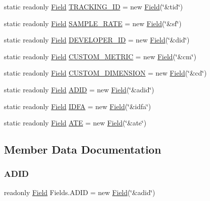 \begin{DoxyCompactItemize}
\item 
static readonly \hyperlink{class_field}{Field} \hyperlink{class_fields_a65770a6babf50e2f116f47436115df42}{T\+R\+A\+C\+K\+I\+N\+G\+\_\+\+ID} = new \hyperlink{class_field}{Field}(\char`\"{}\&tid\char`\"{})
\item 
static readonly \hyperlink{class_field}{Field} \hyperlink{class_fields_abc3a1cf22dab4a6379db835bcace0fdc}{S\+A\+M\+P\+L\+E\+\_\+\+R\+A\+TE} = new \hyperlink{class_field}{Field}(\char`\"{}\&sf\char`\"{})
\item 
static readonly \hyperlink{class_field}{Field} \hyperlink{class_fields_a3d77e1376a9535431a6ac55afaf65ddc}{D\+E\+V\+E\+L\+O\+P\+E\+R\+\_\+\+ID} = new \hyperlink{class_field}{Field}(\char`\"{}\&did\char`\"{})
\item 
static readonly \hyperlink{class_field}{Field} \hyperlink{class_fields_a6048f26caabfa3939d203c44cf59adf3}{C\+U\+S\+T\+O\+M\+\_\+\+M\+E\+T\+R\+IC} = new \hyperlink{class_field}{Field}(\char`\"{}\&cm\char`\"{})
\item 
static readonly \hyperlink{class_field}{Field} \hyperlink{class_fields_aa0211b60165281dc96d060a2da92f25a}{C\+U\+S\+T\+O\+M\+\_\+\+D\+I\+M\+E\+N\+S\+I\+ON} = new \hyperlink{class_field}{Field}(\char`\"{}\&cd\char`\"{})
\item 
static readonly \hyperlink{class_field}{Field} \hyperlink{class_fields_acee079c049927d45db38759de7ce9bd0}{A\+D\+ID} = new \hyperlink{class_field}{Field}(\char`\"{}\&adid\char`\"{})
\item 
static readonly \hyperlink{class_field}{Field} \hyperlink{class_fields_a577a707403fe7ef1513e708467ef12e1}{I\+D\+FA} = new \hyperlink{class_field}{Field}(\char`\"{}\&idfa\char`\"{})
\item 
static readonly \hyperlink{class_field}{Field} \hyperlink{class_fields_a1a11562abdde153dd2479909c10bde83}{A\+TE} = new \hyperlink{class_field}{Field}(\char`\"{}\&ate\char`\"{})
\end{DoxyCompactItemize}


\subsection{Member Data Documentation}
\mbox{\label{class_fields_acee079c049927d45db38759de7ce9bd0}} 
\subsubsection{\texorpdfstring{A\+D\+ID}{ADID}}
{\footnotesize\ttfamily readonly \hyperlink{class_field}{Field} Fields.\+A\+D\+ID = new \hyperlink{class_field}{Field}(\char`\"{}\&adid\char`\"{})\hspace{0.3cm}{\ttfamily [static]}}

